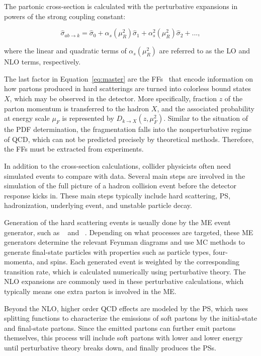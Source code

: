 The partonic cross-section is calculated with the perturbative expansions in powers of the strong coupling constant:

\begin{equation}
\label{eq:expand}
\hat{\sigma}_{ab\rightarrow k}=\hat{\sigma}_{0}+\alpha_{s}(\mu_{R}^2)\hat{\sigma}_{1}+\alpha_{s}^{2}(\mu_{R}^2)\hat{\sigma}_{2}+...,
\end{equation}

where the linear and quadratic terms of $\alpha_{s}(\mu_{R}^2)$ are referred to as the \ac{LO} and \ac{NLO} terms, respectively. 

The last factor in Equation~\ref{eq:master} are the \acp{FF}~\cite{Field:1976ve} that encode information on how partons produced in hard scatterings are turned into colorless bound states $X$, which may be observed in the detector. More specifically, fraction $z$ of the parton momentum is transferred to the hadron $X$, and the associated probability at energy scale $\mu_{F}$ is represented by $D_{k\rightarrow X}(z,\mu_{F}^2)$. Similar to the situation of the \ac{PDF} determination, the fragmentation falls into the nonperturbative regime of \ac{QCD}, which can not be predicted precisely by theoretical methods. Therefore, the \acp{FF} must be extracted from experiments.  

In addition to the cross-section calculations, collider physicists often need simulated events to compare with data. Several main steps are involved in the simulation of the full picture of a hadron collision event before the detector response kicks in. These main steps typically include hard scattering, \ac{PS}, hadronization, underlying event, and unstable particle decay.

Generation of the hard scattering events is usually done by the \ac{ME} event generator, such as \MG~\cite{Alwall:2014hca} and \Pow~\cite{Frixione:2007vw}. Depending on what processes are targeted, these \ac{ME} generators determine the relevant Feynman diagrams and use \ac{MC} methods to generate final-state particles with properties such as particle types, four-momenta, and spins. Each generated event is weighted by the corresponding transition rate, which is calculated numerically using perturbative theory. The \ac{NLO} expansions are commonly used in these perturbative calculations, which typically means one extra parton is involved in the \ac{ME}.

Beyond the \ac{NLO}, higher order \ac{QCD} effects are modeled by the \ac{PS}, which uses splitting functions to characterize the emissions of soft partons by the initial-state and final-state partons. Since the emitted partons can further emit partons themselves, this process will include soft partons with lower and lower energy until perturbative theory breaks down, and finally produces the \acp{PS}. 

